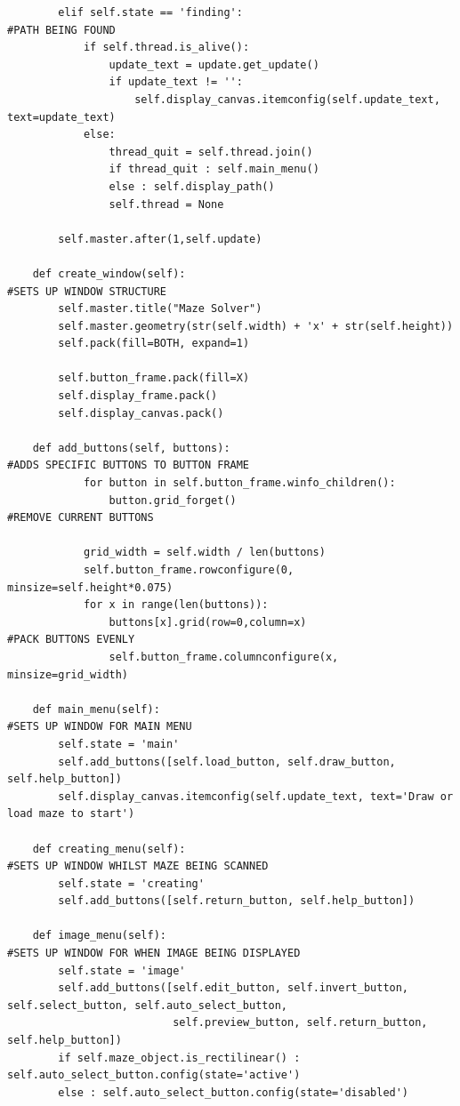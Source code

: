 \documentclass[titlepage]{article}
\begin{document}
\begin{changemargin}{-1in}{-1in}
\begin{verbatim}
        elif self.state == 'finding':                                           #PATH BEING FOUND
            if self.thread.is_alive():
                update_text = update.get_update()
                if update_text != '':
                    self.display_canvas.itemconfig(self.update_text, text=update_text)
            else:
                thread_quit = self.thread.join()
                if thread_quit : self.main_menu()
                else : self.display_path()
                self.thread = None            
        
        self.master.after(1,self.update)                                        

    def create_window(self):                                                    #SETS UP WINDOW STRUCTURE
        self.master.title("Maze Solver")
        self.master.geometry(str(self.width) + 'x' + str(self.height))
        self.pack(fill=BOTH, expand=1)

        self.button_frame.pack(fill=X)
        self.display_frame.pack()
        self.display_canvas.pack()

    def add_buttons(self, buttons):                                             #ADDS SPECIFIC BUTTONS TO BUTTON FRAME
            for button in self.button_frame.winfo_children():
                button.grid_forget()                                            #REMOVE CURRENT BUTTONS

            grid_width = self.width / len(buttons)
            self.button_frame.rowconfigure(0, minsize=self.height*0.075)
            for x in range(len(buttons)):
                buttons[x].grid(row=0,column=x)                                 #PACK BUTTONS EVENLY
                self.button_frame.columnconfigure(x, minsize=grid_width)

    def main_menu(self):                                                        #SETS UP WINDOW FOR MAIN MENU                                                       
        self.state = 'main'
        self.add_buttons([self.load_button, self.draw_button, self.help_button])
        self.display_canvas.itemconfig(self.update_text, text='Draw or load maze to start')

    def creating_menu(self):                                                    #SETS UP WINDOW WHILST MAZE BEING SCANNED 
        self.state = 'creating'
        self.add_buttons([self.return_button, self.help_button])

    def image_menu(self):                                                       #SETS UP WINDOW FOR WHEN IMAGE BEING DISPLAYED
        self.state = 'image'
        self.add_buttons([self.edit_button, self.invert_button, self.select_button, self.auto_select_button,
                          self.preview_button, self.return_button, self.help_button])
        if self.maze_object.is_rectilinear() : self.auto_select_button.config(state='active')
        else : self.auto_select_button.config(state='disabled')


\end{verbatim}
\end{changemargin}
\end{document}
